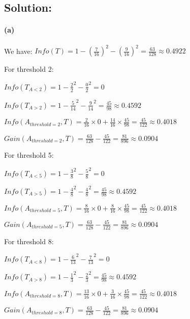 \subsection*{Solution:}

\paragraph*{(a)} We have: $Info(T) = 1 - (\frac{7}{16})^2 - (\frac{9}{16})^2 = \frac{63}{128} \approx 0.4922$

For threshold 2:

$Info(T_{A<2}) = 1 - \frac{2}{2}^2 - \frac{0}{2}^2 = 0$

$Info(T_{A>2}) = 1 - \frac{5}{14}^2- \frac{9}{14}^2 = \frac{45}{98} \approx 0.4592$

$Info(A_{threshold=2}, T) = \frac{2}{16} \times 0 + \frac{14}{16} \times \frac{45}{98} = \frac{45}{122} \approx 0.4018$

$Gain(A_{threshold=2}, T) = \frac{63}{128} - \frac{45}{122} = \frac{81}{896} \approx 0.0904$

For threshold 5:

$Info(T_{A<5}) = 1 - \frac{3}{8}^2 - \frac{5}{8}^2 = 0$

$Info(T_{A>5}) = 1 - \frac{4}{8}^2- \frac{4}{8}^2 = \frac{45}{98} \approx 0.4592$

$Info(A_{threshold=5}, T) = \frac{8}{16} \times 0 + \frac{8}{16} \times \frac{45}{98} = \frac{45}{122} \approx 0.4018$

$Gain(A_{threshold=5}, T) = \frac{63}{128} - \frac{45}{122} = \frac{81}{896} \approx 0.0904$

For threshold 8:

$Info(T_{A<8}) = 1 - \frac{6}{13}^2 - \frac{7}{13}^2 = 0$

$Info(T_{A>8}) = 1 - \frac{1}{3}^2- \frac{2}{3}^2 = \frac{45}{98} \approx 0.4592$

$Info(A_{threshold=8}, T) = \frac{13}{16} \times 0 + \frac{3}{16} \times \frac{45}{98} = \frac{45}{122} \approx 0.4018$

$Gain(A_{threshold=8}, T) = \frac{63}{128} - \frac{45}{122} = \frac{81}{896} \approx 0.0904$

